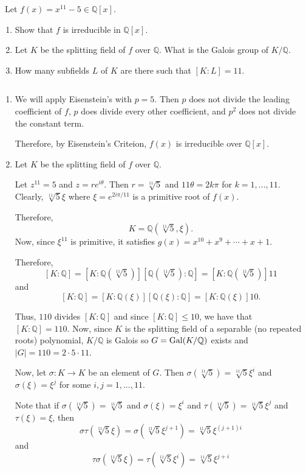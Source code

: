 \documentclass[12pt]{AlgebraQual}
\begin{document}
\begin{problem} $\,$
Let $f(x)=x^{11}-5\in\mathbb{Q}[x]$.
\begin{enumerate}[label=(\alph*)]
    \item Show that $f$ is irreducible in $\mathbb{Q}[x].$
    \item Let $K$ be the splitting field of $f$ over $\mathbb{Q}.$ What is the Galois group of $K/\mathbb{Q}$.
    \item How many subfields $L$ of $K$ are there such that $[K:L]=11$.
\end{enumerate}
\end{problem}


\begin{solution}$\,$
\begin{enumerate}[label=(\alph*)]
    \item We will apply Eisenstein's with $p=5$. Then $p$ does not divide the leading coefficient of $f$, $p$ does divide every other coefficient, and $p^2$ does not divide the constant term.

    Therefore, by Eisenstein's Criteion, $f(x)$ is irreducible over $\mathbb{Q}[x]$.
    \item Let $K$ be the splitting field of $f$ over $\mathbb{Q}.$

    Let $z^{11}=5$ and $z=re^{i\theta}$. Then $r=\sqrt[11]{5}$ and $11\theta=2k\pi$ for $k=1,...,11$. Clearly, $\sqrt[11]{5}\xi$ where $\xi=e^{2i\pi/11}$ is a primitive root of $f(x)$.

    Therefore, $$K=\mathbb{Q}(\sqrt[11]{5},\xi).$$ Now, since $\xi^{11}$ is primitive, it satisfies $g(x)=x^{10}+x^9+\cdots+x+1$.

    Therefore, $$[K:\mathbb{Q}]=[K:\mathbb{Q}(\sqrt[11]{5})][\mathbb{Q}(\sqrt[11]{5}):\mathbb{Q}]=[K:\mathbb{Q}(\sqrt[11]{5})]11$$ and $$[K:\mathbb{Q}]=[K:\mathbb{Q}(\xi)][\mathbb{Q}(\xi):\mathbb{Q}]=[K:\mathbb{Q}(\xi)]10.$$

    Thus, $110$ divides $[K:\mathbb{Q}]$ and since $[K:\mathbb{Q}]\le10$, we have that $[K:\mathbb{Q}]=110.$ Now, since $K$ is the splitting field of a separable (no repeated roots) polynomial, $K/\mathbb{Q}$ is Galois so $G=\text{Gal}(K/\mathbb{Q})$ exists and $|G|=110=2\cdot5\cdot11$.

    Now, let $\sigma:K\to K$ be an element of $G$. Then $\sigma(\sqrt[11]{5})=\sqrt[11]{5}\xi^i$ and $\sigma(\xi)=\xi^j$ for some $i,j=1,...,11$.

    Note that if $\sigma(\sqrt[11]{5})=\sqrt[11]{5}$ and $\sigma(\xi)=\xi^i$ and $\tau(\sqrt[11]{5})=\sqrt[11]{5}\xi^j$ and $\tau(\xi)=\xi$, then $$\sigma\tau(\sqrt[11]{5}\xi)=\sigma(\sqrt[11]{5}\xi^{j+1})=\sqrt[11]{5}\xi^{(j+1)i}$$ and $$\tau\sigma(\sqrt[11]{5}\xi)=\tau(\sqrt[11]{5}\xi^i)=\sqrt[11]{5}\xi^{j+i}$$


\end{enumerate}
\end{solution}
\end{document}
